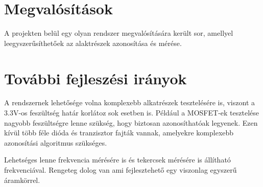 \section{Megvalósítások}

A projekten belül egy olyan rendszer megvalósítására került sor,
amellyel leegyszerűsíthetőek az alaktrészek azonosítása és mérése.




\section{További fejleszési irányok}

A rendszernek lehetősége volna komplexebb alkatrészek
tesztelésére is, viszont a 3.3V-os feszültség határ
korlátoz sok esetben is. Például a MOSFET-ek tesztelése nagyobb
feszültségre lenne szükség, hogy biztosan azonosíthatóak legyenek.
Ezen kívül több féle dióda és tranzisztor fajták vannak, 
amelyekre komplexebb azonosítási algoritmus szükséges.

Lehetséges lenne frekvencia mérésére is és tekercsek mérésére
is állítható frekvenciával. Rengeteg dolog van ami fejlesztehető
egy viszonlag egyszerű áramkörrel.


